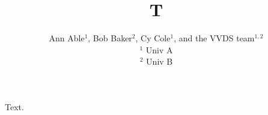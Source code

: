 \documentclass{article}
\begin{document}
\title{T}
\author{Ann Able$^{1}$, Bob Baker$^2$, Cy Cole$^1$, and the VVDS team$^{1, 2}$ \\ $^1$ Univ A \\ $^2$ Univ B}
\maketitle
Text.
\end{document}
